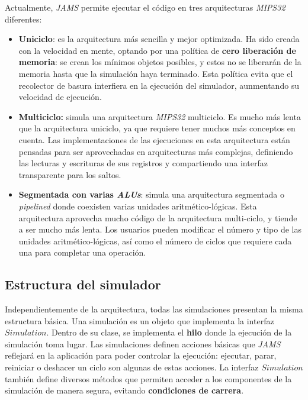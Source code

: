 Actualmente, \textit{JAMS} permite ejecutar el código
en tres arquitecturas \textit{MIPS32} diferentes:
\begin{itemize}
    \item \textbf{Uniciclo}: es la arquitectura más sencilla y
    mejor optimizada.
    Ha sido creada con la velocidad en mente, optando por una
    política de \textbf{cero liberación de memoria}: se crean los mínimos
    objetos posibles, y estos no se liberarán de la memoria hasta que
    la simulación haya terminado.
    Esta política evita que el recolector de basura interfiera en la
    ejecución del simulador, aunmentando su velocidad de ejecución.
    \item \textbf{Multiciclo:} simula una arquitectura
    \textit{MIPS32} multiciclo.
    Es mucho más lenta que la arquitectura uniciclo, ya que requiere
    tener muchos más conceptos en cuenta.
    Las implementaciones de las ejecuciones en esta arquitectura
    están pensadas para ser aprovechadas en arquitecturas más
    complejas, definiendo las lecturas y escrituras de sus
    registros y compartiendo una interfaz transparente para los saltos.
    \item \textbf{Segmentada con varias \textit{ALUs}}: simula
    una arquitectura segmentada o \textit{pipelined} donde coexisten varias
    unidades aritmético-lógicas.
    Esta arquitectura aprovecha mucho código de la arquitectura
    multi-ciclo, y tiende a ser mucho más lenta.
    Los usuarios pueden modificar el número y tipo de las unidades
    aritmético-lógicas, así como el número de ciclos que requiere
    cada una para completar una operación.
\end{itemize}

\subsection{Estructura del simulador}\label{subsec:estructura-del-simulador}

Independientemente de la arquitectura, todas las simulaciones presentan
la misma estructura básica.
Una simulación es un objeto que implementa la interfaz $Simulation$.
Dentro de su clase, se implementa el \textbf{hilo} donde la ejecución
de la simulación toma lugar.
Las simulaciones definen acciones básicas que \textit{JAMS} reflejará en la
aplicación para poder controlar la ejecución: ejecutar, parar, reiniciar
o deshacer un ciclo son algunas de estas acciones.
La interfaz $Simulation$ también define diversos métodos
que permiten acceder a los componentes de la simulación de
manera segura, evitando \textbf{condiciones de carrera}.

